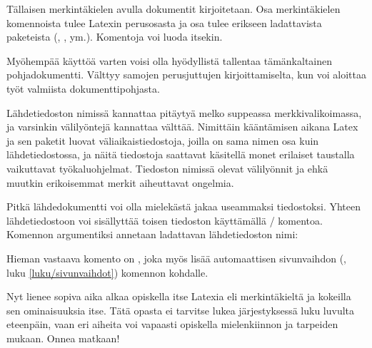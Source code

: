 Tällaisen merkintäkielen avulla dokumentit kirjoitetaan. Osa
merkintäkielen komennoista tulee Latexin perusosasta ja osa tulee
erikseen ladattavista paketeista (,
,  ym.). Komentoja voi luoda
itsekin.

Myöhempää käyttöä varten voisi olla hyödyllistä tallentaa tämänkaltainen
pohjadokumentti. Välttyy samojen perusjuttujen kirjoittamiselta, kun voi
aloittaa työt valmiista dokumenttipohjasta.

Lähdetiedoston nimissä kannattaa pitäytyä melko suppeassa
merkkivalikoimassa, ja varsinkin välilyöntejä kannattaa välttää.
Nimittäin kääntämisen aikana Latex ja sen paketit luovat
väliaikaistiedostoja, joilla on sama nimen osa kuin lähdetiedostossa, ja
näitä tiedostoja saattavat käsitellä monet erilaiset taustalla
vaikuttavat työkaluohjelmat. Tiedoston nimissä olevat välilyönnit ja
ehkä muutkin erikoisemmat merkit aiheuttavat ongelmia.

Pitkä lähdedokumentti voi olla mielekästä jakaa useammaksi tiedostoksi.
Yhteen lähdetiedostoon voi sisällyttää toisen tiedoston käyttämällä
\-/ komentoa. Komennon argumentiksi annetaan ladattavan
lähdetiedoston nimi:

\begin{koodilohkosis}

\end{koodilohkosis}

\noindent
Hieman vastaava komento on , joka myös lisää
automaattisen sivunvaihdon (, luku
\ref{luku/sivunvaihdot}) komennon kohdalle.

Nyt lienee sopiva aika alkaa opiskella itse Latexia eli merkintäkieltä
ja kokeilla sen ominaisuuksia itse. Tätä opasta ei tarvitse lukea
järjestyksessä luku luvulta eteenpäin, vaan eri aiheita voi vapaasti
opiskella mielenkiinnon ja tarpeiden mukaan. Onnea matkaan!
